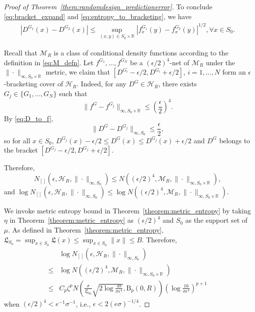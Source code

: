 \documentclass[11pt]{article}
\numberwithin{equation}{section}
\newcommand{\RS}{\mathbb{R}}
\newcommand{\ball}{\mathrm{B}}
\newcommand{\lipsz}{\mathfrak{L}}
\begin{document}
\begin{appendices}
\begin{proof}[Proof of Theorem~\ref{them:randomdesign_predictionerror}]
To conclude  \eqref{eq:bracket_expand} and \eqref{eq:entropy_to_bracketing}, we have
\begin{equation}
\begin{split}
|D^{G_1}(x) - D^{G_2}(x)| \leq  \sup_{(x,y)\in S_0 \times \RS} |f^{G_1}_x(y) - f^{G_2}_x(y)|^{1/2}, \forall x \in S_0.
\end{split}
\label{eq:D_to_f}
\end{equation}

Recall that $\mathcal{M}_R$ is a class of conditional density functions according to the definition in \eqref{eq:M_defn}.  Let $f^{G_1}, \dots, f^{G_N}$ be a $(\epsilon/2)^4$-net of $\mathcal{M}_R$ under the $\| \cdot \|_{\infty, S_0 \times \RS}$ metric, we claim that $[D^{G_i} - \epsilon/2, D^{G_i}+\epsilon/2]$, $i =1,\dots, N$ form an $\epsilon$-bracketing cover of $\mathcal{H}_R$. Indeed, for any $D^G \in \mathcal{H}_R$, there exists $G_j \in \{G_1,\dots,G_N\}$ such that
\[
\| f^G - f^{G_j}\|_{\infty, S_0\times \RS} \leq \left(\frac{\epsilon}{2}\right)^4.
\]
By \eqref{eq:D_to_f}, 
\[
\| D^{G} - D^{G_j} \|_{\infty, S_0} \leqslant \frac{\epsilon}{2},
\]
so for all $x\in S_0$, $D^{G_j}(x) - \epsilon/2 \leqslant D^G(x) \leqslant D^{G_j}(x) +\epsilon/2$ and 
$D^G$ belongs to the bracket $[D^{G_j} - \epsilon/2, D^{G_j}+\epsilon/2]$.

Therefore, 
\[
N_{[]}(\epsilon, \mathcal{H}_R, \| \cdot\|_{\infty,S_0})
\leq N((\epsilon/2)^4, \mathcal{M}_R, \| \cdot\|_{\infty, S_0\times \RS}),
\]
and $ \log N_{[]}(\epsilon, \mathcal{H}_R, \| \cdot\|_{\infty,S_0})
\leq \log N((\epsilon/2)^4, \mathcal{M}_R, \| \cdot\|_{\infty, S_0\times \RS})$.

We invoke metric entropy bound in Theorem~\ref{theorem:metric_entropy} by taking $\eta$ in Theorem~\ref{theorem:metric_entropy} as $(\epsilon/2)^4$ and $S_0$ as the support set of $\mu$. As defined in Theorem~\ref{theorem:metric_entropy}, $\lipsz_{S_0} = \sup_{x \in S_0} \lipsz(x) \leq \sup_{x \in S_0} \|x\| \leq B$.
Therefore,
\begin{equation}
\begin{split}
&\log N_{[]}(\epsilon, \mathcal{H}_R, \| \cdot\|_{\infty,S_0})\\
\leq&
\log N((\epsilon/2)^4, \mathcal{M}_R, \| \cdot \|_{\infty,S_0\times \RS})\\
 \leq &C_p \zeta^p N( \frac{\sigma}{\lipsz_{S_0}}\sqrt{2 \log\frac{48}{\sigma\epsilon^{4}}} , \ball_p(0,R)) \left(\log \frac{16}{\sigma \epsilon^4}\right)^{p+1}
 \end{split}
 \label{eq:metric_to_bracket}
\end{equation}
when $(\epsilon/2)^4 < e^{-1}\sigma^{-1}$, i.e., $\epsilon < 2(e\sigma)^{-1/4}$.


\end{proof}
\end{appendices}
\end{document}
